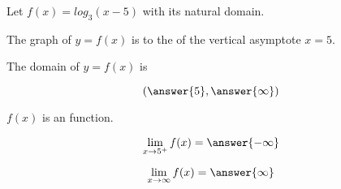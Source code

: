 \documentclass{ximera}
\author{Lee Wayand}
\begin{document}
\begin{exercise}






Let $f(x) = log_3(x-5)$ with its natural domain. \\





\begin{question}


The graph of $y = f(x)$ is to the  of the vertical asymptote $x = 5$.


\end{question}





\begin{question}


The domain of $y = f(x)$ is 

\[
\left( \answer{5}, \answer{\infty} \right)
\]


\end{question}






\begin{question}


$f(x)$ is an  function.


\end{question}











\begin{question}


\[
\lim\limits_{x \to 5^+} f(x) = \answer{-\infty}
\]


\end{question}








\begin{question}


\[
\lim\limits_{x \to \infty} f(x) = \answer{\infty}
\]


\end{question}










\end{exercise}
\end{document}
